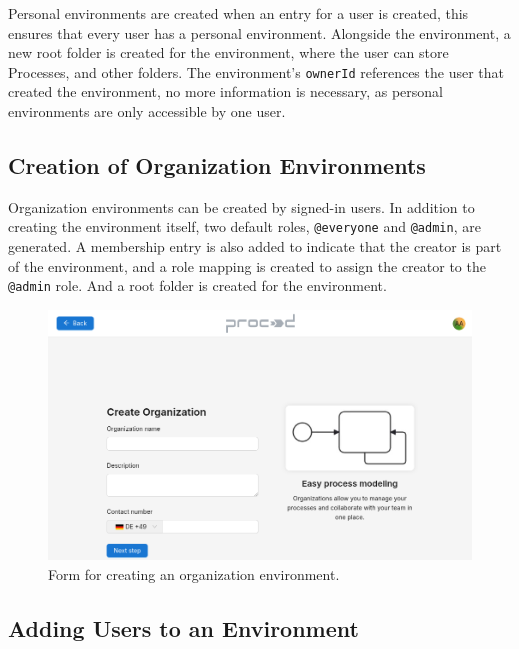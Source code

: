 Personal environments are created when an entry for a user is created, this ensures that
every user has a personal environment.
Alongside the environment, a new root folder is created for the environment, where the
user can store Processes, and other folders.
The environment's \lstinline{ownerId} references the user that created the environment,
no more information is necessary, as personal environments are only accessible by one
user.

\subsection{Creation of Organization Environments}

Organization environments can be created by signed-in users.
In addition to creating the environment itself, two default roles,
\lstinline{@everyone} and \lstinline{@admin}, are generated.
A membership entry is also added to indicate that the creator is part of the environment,
and a role mapping is created to assign the creator to the \lstinline{@admin} role.
And a root folder is created for the environment.

\begin{figure}[H]
	\centering
	\includegraphics[scale=0.3]{images/create-organization-ui.png}
	\caption{Form for creating an organization environment.}
	\vspace{-1em} %
	\label{fig:prompt-fill-personal-information}
\end{figure}

\subsection{Adding Users to an Environment}

